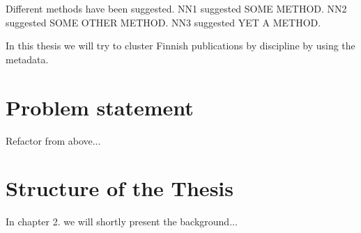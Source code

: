 Different methods have been suggested. NN1 suggested SOME METHOD. 
NN2 suggested SOME OTHER METHOD. NN3 suggested YET A METHOD.

In this thesis we will try to cluster Finnish publications by 
discipline by using the metadata.





\section{Problem statement}

Refactor from above...

\section{Structure of the Thesis}
\label{section:structure} 

In chapter 2. we will shortly present the background...

